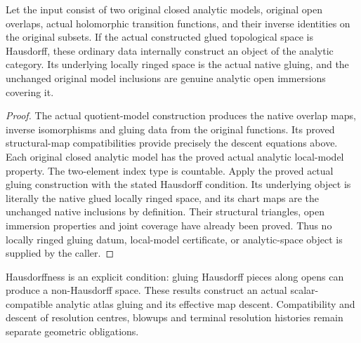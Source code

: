 \begin{theorem}
\label{hir:reduced-analytic-original-two-model-gluing}
Let the input consist of two original closed analytic models, original
open overlaps, actual holomorphic transition functions, and their
inverse identities on the original subsets. If the actual constructed
glued topological space is Hausdorff, these ordinary data internally
construct an object of the analytic category. Its underlying locally
ringed space is the actual native gluing, and the unchanged original
model inclusions are genuine analytic open immersions covering it.
\leanok
\end{theorem}
\begin{proof}
The actual quotient-model construction produces the native overlap
maps, inverse isomorphisms and gluing data from the original functions.
Its proved structural-map compatibilities provide precisely the
descent equations above. Each original closed analytic model has the
proved actual analytic local-model property. The two-element index
type is countable. Apply the proved actual gluing construction with
the stated Hausdorff condition. Its underlying object is literally
the native glued locally ringed space, and its chart maps are the
unchanged native inclusions by definition. Their structural triangles,
open immersion properties and joint coverage have already been
proved. Thus no locally ringed gluing datum, local-model certificate,
or analytic-space object is supplied by the caller.
\end{proof}

Hausdorffness is an explicit condition: gluing Hausdorff pieces along
opens can produce a non-Hausdorff space. These results construct an
actual scalar-compatible analytic atlas gluing and its effective map
descent. Compatibility and descent of resolution centres, blowups and
terminal resolution histories remain separate geometric obligations.
